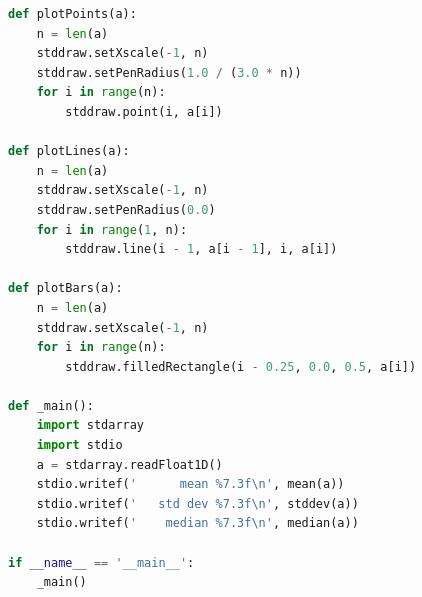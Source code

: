 \documentclass[8pt,a4paper,compress]{beamer}
\begin{document}
\begin{frame}[fragile]
\pause

\begin{lstlisting}[language=Python,style=focusin]
def plotPoints(a):
    n = len(a)
    stddraw.setXscale(-1, n)
    stddraw.setPenRadius(1.0 / (3.0 * n))
    for i in range(n):
        stddraw.point(i, a[i])

def plotLines(a):
    n = len(a)
    stddraw.setXscale(-1, n)
    stddraw.setPenRadius(0.0)
    for i in range(1, n):
        stddraw.line(i - 1, a[i - 1], i, a[i])

def plotBars(a):
    n = len(a)
    stddraw.setXscale(-1, n)
    for i in range(n):
        stddraw.filledRectangle(i - 0.25, 0.0, 0.5, a[i])

def _main():
    import stdarray
    import stdio
    a = stdarray.readFloat1D()
    stdio.writef('      mean %7.3f\n', mean(a))
    stdio.writef('   std dev %7.3f\n', stddev(a))
    stdio.writef('    median %7.3f\n', median(a))

if __name__ == '__main__':
    _main()
\end{lstlisting}
\end{frame}
\end{document}
